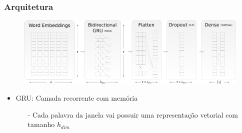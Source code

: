 \documentclass[10pt]{beamer}
\begin{document}
\begin{frame}[fragile]
\frametitle{Arquitetura}
  
  

  \begin{figure}
      \begin{center}
        \hspace*{-2em}
        \includegraphics[scale=0.16]{img/recurrent_model_horizontal.pdf}
      \end{center}
  \end{figure}

  \begin{itemize}
    \item GRU: Camada recorrente com memória
    \begin{itemize}
      \item[-] Cada palavra da janela vai possuir uma representação vetorial com tamanho $h_{dim}$
    \end{itemize}
  \end{itemize}

\end{frame}
\end{document}
